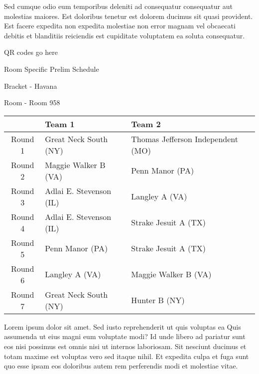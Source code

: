 \documentclass{article}%
\begin{document}
\newline%
Sed cumque odio eum temporibus deleniti ad consequatur consequatur aut molestias maiores. Est doloribus tenetur est dolorem ducimus sit quasi provident. Est facere expedita non expedita molestiae non error magnam vel obcaecati debitis et blanditiis reiciendis est cupiditate voluptatem ea soluta consequatur.%
\vspace*{140pt}%
\begin{center}%
\begin{Huge}%
QR codes go here%
\end{Huge}%
\end{center}%
\newpage%
\begin{center}%
\begin{Huge}%
Room Specific Prelim Schedule%
\end{Huge}%
\vspace*{8pt}%
\linebreak%
\begin{Large}%
Bracket {-} Havana%
\end{Large}%
\vspace*{8pt}%
\linebreak%
\vspace*{8pt}%
\begin{Large}%
Room {-} Room 958%
\end{Large}%
\end{center}%
%
\begin{tabularx}{\textwidth}{|c|Y|Y|}%
\hline%
&Team 1&Team 2\\%
\hline%
Round 1&Great Neck South (NY)&Thomas Jefferson Independent (MO)\\%
Round 2&Maggie Walker B (VA)&Penn Manor (PA)\\%
Round 3&Adlai E. Stevenson (IL)&Langley A (VA)\\%
Round 4&Adlai E. Stevenson (IL)&Strake Jesuit A (TX)\\%
Round 5&Penn Manor (PA)&Strake Jesuit A (TX)\\%
Round 6&Langley A (VA)&Maggie Walker B (VA)\\%
Round 7&Great Neck South (NY)&Hunter B (NY)\\%
\hline%
\end{tabularx}%
\vspace*{8pt}%
\newline%
Lorem ipsum dolor sit amet. Sed iusto reprehenderit ut quis voluptas ea Quis assumenda ut eius magni eum voluptate modi? Id unde libero ad pariatur sunt eos nisi possimus est omnis nisi ut internos laboriosam. Sit nesciunt ducimus et totam maxime est voluptas vero sed itaque nihil. Et expedita culpa et fuga sunt quo esse ipsam eos doloribus autem rem perferendis modi et molestiae vitae.\newline%
\end{document}
